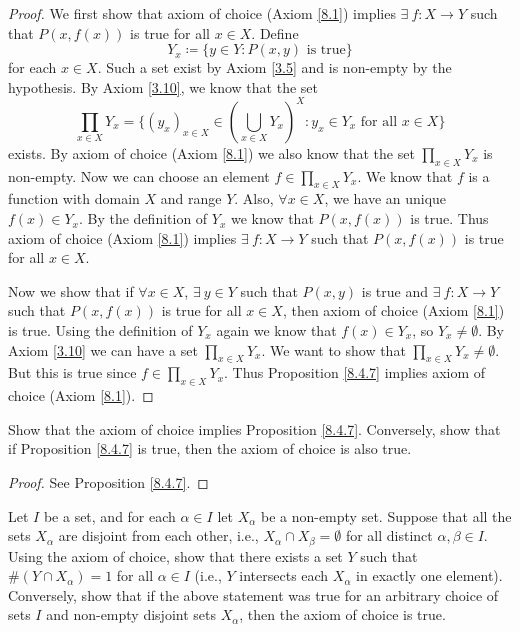 \begin{proof}
    We first show that axiom of choice (Axiom \ref{8.1}) implies \(\exists\ f : X \to Y\) such that \(P(x, f(x))\) is true for all \(x \in X\).
    Define
    \[
        Y_x \coloneqq \{y \in Y : P(x, y) \text{ is true}\}
    \]
    for each \(x \in X\).
    Such a set exist by Axiom \ref{3.5} and is non-empty by the hypothesis.
    By Axiom \ref{3.10}, we know that the set
    \[
        \prod_{x \in X} Y_x = \Bigg\{(y_x)_{x \in X} \in (\bigcup_{x \in X} Y_x)^X : y_x \in Y_x \text{ for all } x \in X\Bigg\}
    \]
    exists.
    By axiom of choice (Axiom \ref{8.1}) we also know that the set \(\prod_{x \in X} Y_x\) is non-empty.
    Now we can choose an element \(f \in \prod_{x \in X} Y_x\).
    We know that \(f\) is a function with domain \(X\) and range \(Y\).
    Also, \(\forall x \in X\), we have an unique \(f(x) \in Y_x\).
    By the definition of \(Y_x\) we know that \(P(x, f(x))\) is true.
    Thus axiom of choice (Axiom \ref{8.1}) implies \(\exists\ f : X \to Y\) such that \(P(x, f(x))\) is true for all \(x \in X\).

    Now we show that if \(\forall x \in X\), \(\exists\ y \in Y\) such that \(P(x, y)\) is true and \(\exists\ f : X \to Y\) such that \(P(x, f(x))\) is true for all \(x \in X\), then axiom of choice (Axiom \ref{8.1}) is true.
    Using the definition of \(Y_x\) again we know that \(f(x) \in Y_x\), so \(Y_x \neq \emptyset\).
    By Axiom \ref{3.10} we can have a set \(\prod_{x \in X} Y_x\).
    We want to show that \(\prod_{x \in X} Y_x \neq \emptyset\).
    But this is true since \(f \in \prod_{x \in X} Y_x\).
    Thus Proposition \ref{8.4.7} implies axiom of choice (Axiom \ref{8.1}).
\end{proof}

\exercisesection

\begin{exercise}\label{ex 8.4.1}
    Show that the axiom of choice implies Proposition \ref{8.4.7}.
    Conversely, show that if Proposition \ref{8.4.7} is true, then the axiom of choice is also true.
\end{exercise}

\begin{proof}
    See Proposition \ref{8.4.7}.
\end{proof}

\begin{exercise}\label{ex 8.4.2}
    Let \(I\) be a set, and for each \(\alpha \in I\) let \(X_{\alpha}\) be a non-empty set.
    Suppose that all the sets \(X_{\alpha}\) are disjoint from each other, i.e., \(X_{\alpha} \cap X_{\beta} = \emptyset\) for all distinct \(\alpha, \beta \in I\).
    Using the axiom of choice, show that there exists a set \(Y\) such that \(\#(Y \cap X_{\alpha}) = 1\) for all \(\alpha \in I\) (i.e., \(Y\) intersects each \(X_{\alpha}\) in exactly one element).
    Conversely, show that if the above statement was true for an arbitrary choice of sets \(I\) and non-empty disjoint sets \(X_{\alpha}\), then the axiom of choice is true.
\end{exercise}


